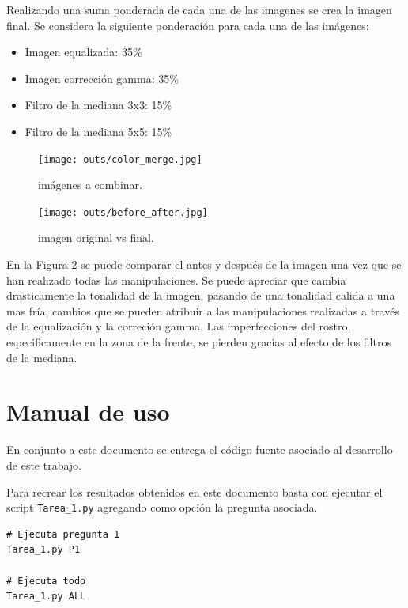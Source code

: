 \documentclass[letterpaper,9pt,journal,final]{IEEEtran}
\providecommand{\tightlist}{%
  \setlength{\itemsep}{0pt}\setlength{\parskip}{0pt}}
\begin{document}
Realizando una suma ponderada de cada una de las imagenes se crea la imagen final. Se considera la siguiente ponderación para cada una de las imágenes:

\begin{itemize}
\tightlist
\item
  Imagen equalizada: 35\%
\item
  Imagen corrección gamma: 35\%
 \item
  Filtro de la mediana 3x3: 15\%
\item
  Filtro de la mediana 5x5: 15\%
\end{itemize}

\begin{figure}[h!]
\hypertarget{fig:to_merge}{%
\centering
\texttt{[image: outs/color\_merge.jpg]}
\caption{imágenes a combinar.}\label{fig:to_merge}
}
\end{figure}


\begin{figure}[h!]
\hypertarget{fig:final}{%
\centering
\texttt{[image: outs/before\_after.jpg]}
\caption{imagen original vs final.}\label{fig:final}
}
\end{figure}

En la Figura \ref{fig:final} se puede comparar el antes y después de la
imagen una vez que se han realizado todas las manipulaciones. Se puede
apreciar que cambia drasticamente la tonalidad de la imagen, pasando de
una tonalidad calida a una mas fría, cambios que se pueden atribuir a
las manipulaciones realizadas a través de la equalización y la correción
gamma. Las imperfecciones del rostro, especificamente en la zona de la
frente, se pierden gracias al efecto de los filtros de la mediana.

\hypertarget{manual-de-uso}{%
\section{Manual de uso}\label{manual-de-uso}}

En conjunto a este documento se entrega el código fuente asociado al
desarrollo de este trabajo.

Para recrear los resultados obtenidos en este documento basta con
ejecutar el script \texttt{Tarea\_1.py} agregando como opción la
pregunta asociada.

\begin{verbatim}
# Ejecuta pregunta 1
Tarea_1.py P1

# Ejecuta todo
Tarea_1.py ALL
\end{verbatim}
\end{document}
